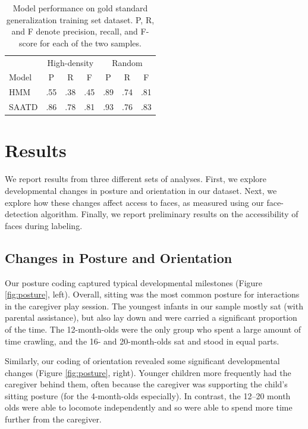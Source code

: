 \documentclass[10pt,letterpaper]{article}
\begin{document}
\begin{table}[t]
  \caption{Model performance on gold standard generalization training set dataset. P, R, and F denote precision, recall, and F-score for each of the two samples. \label{tab:results} } 
  \begin{center} 
    \begin{tabular}{l|ccc|ccc} 
      \hline
       &  \multicolumn{3}{c|}{High-density} &  \multicolumn{3}{c}{Random} \\
      \null Model & P & R & F & P & R & F  \\ 
      \hline 
      HMM &.55  & .38 &  .45 & .89 & .74 & .81   \\
      SAATD & .86 & .78 & .81 & .93 & .76 & .83 \\      
    \hline 
    \end{tabular} 
  \end{center}
\end{table}



\section{Results}

We report results from three different sets of analyses. First, we explore developmental changes in posture and orientation in our dataset. Next, we explore how these changes affect access to faces, as measured using our face-detection algorithm. Finally, we report preliminary results on the accessibility of faces during labeling.

\subsection{Changes in Posture and Orientation}
 
Our posture coding captured typical developmental milestones (Figure \ref{fig:posture}, left). Overall, sitting was the most common posture for interactions in the caregiver play session. The youngest infants in our sample mostly sat (with parental assistance), but also lay down and were carried a significant proportion of the time. The 12-month-olds were the only group who spent a large amount of time crawling, and the 16- and 20-month-olds sat and stood in equal parts. 

Similarly, our coding of orientation revealed some significant developmental changes (Figure \ref{fig:posture}, right). Younger children more frequently had the caregiver behind them, often because the caregiver was supporting the child's sitting posture (for the 4-month-olds especially). In contrast, the 12--20 month olds were able to locomote independently and so were able to spend more time further from the caregiver. 
\end{document}
